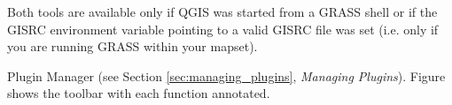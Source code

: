 Both tools are available only if QGIS was started from a GRASS 
shell or if the GISRC environment variable pointing to a
valid GISRC file was set (i.e. only if you are running 
GRASS within your mapset).


Plugin Manager (see Section \ref{sec:managing_plugins}, \textsl{Managing
Plugins}). Figure  shows the toolbar with each function annotated.
